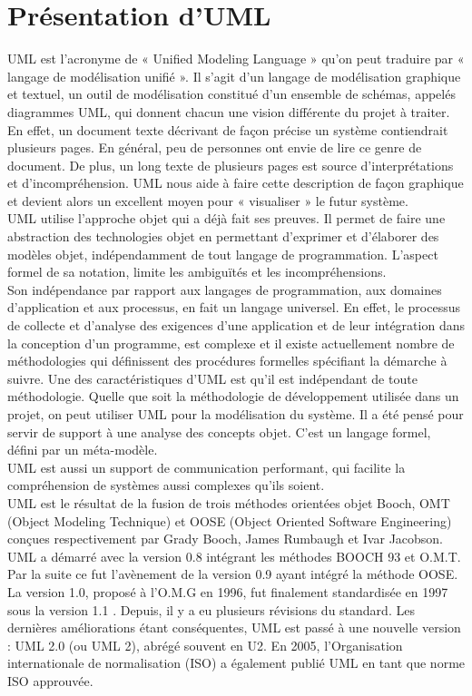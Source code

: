 \section{Présentation d'UML}
UML est l’acronyme de « Unified Modeling Language » qu'on peut traduire par « langage de modélisation unifié ». Il s'agit d'un langage de modélisation graphique et textuel, un outil de modélisation constitué d’un ensemble de schémas, appelés diagrammes UML, qui donnent chacun une vision différente du projet à traiter. En effet, un document texte décrivant de façon précise un système contiendrait plusieurs pages. En général, peu de personnes ont envie de lire ce genre de document. De plus, un long texte de plusieurs pages est source d’interprétations et d’incompréhension. UML nous aide à faire cette description de façon graphique et devient alors un excellent moyen pour « visualiser » le futur système.\\
UML utilise l'approche objet qui a déjà fait ses preuves. Il permet de faire une abstraction des technologies objet en permettant d’exprimer et d’élaborer des modèles objet, indépendamment de tout langage de programmation. L'aspect formel de sa notation, limite les ambiguïtés et les incompréhensions.\\
Son indépendance par rapport aux langages de programmation, aux domaines d'application et
aux processus, en fait un langage universel. En effet, le processus de collecte et d'analyse des exigences d'une application et de leur intégration dans la conception d'un programme, est complexe et il existe actuellement nombre de  méthodologies qui définissent des procédures formelles spécifiant la démarche à suivre. Une des caractéristiques d'UML est qu'il est indépendant de toute méthodologie. Quelle que soit la méthodologie de développement utilisée dans un projet, on peut utiliser UML pour la modélisation du système. Il a été pensé pour servir de support à une analyse des concepts objet. C’est un langage formel, défini par un méta-modèle.\\
UML est aussi un support de communication performant, qui facilite la compréhension de systèmes  aussi complexes qu'ils soient.\\
UML est le résultat de la fusion de trois méthodes orientées objet Booch, OMT (Object Modeling Technique) et OOSE (Object Oriented Software Engineering) conçues respectivement par Grady Booch, James Rumbaugh et Ivar Jacobson. UML a démarré avec la version 0.8 intégrant les méthodes BOOCH 93 et O.M.T. Par la suite ce fut l'avènement de la version 0.9 ayant intégré la méthode OOSE. La version 1.0, proposé à l'O.M.G en 1996, fut finalement standardisée en 1997 sous la version 1.1 . Depuis, il y a eu plusieurs révisions du standard. Les dernières améliorations étant conséquentes, UML est passé à une nouvelle version : UML 2.0 (ou UML 2), abrégé souvent en U2. En 2005, l'Organisation internationale de normalisation (ISO) a également publié UML en tant que norme ISO approuvée.

